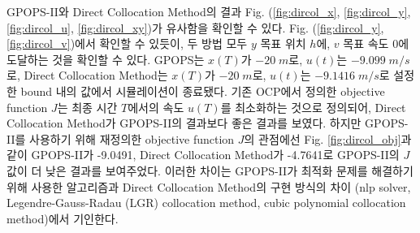 GPOPS-II와 Direct Collocation Method의 결과 Fig. (\ref{fig:dircol_x}, \ref{fig:dircol_y}, \ref{fig:dircol_u}, \ref{fig:dircol_xy})가 유사함을 확인할 수 있다.
Fig. (\ref{fig:dircol_y}, \ref{fig:dircol_v})에서 확인할 수 있듯이, 두 방법 모두 $y$ 목표 위치 $h$에, $v$ 목표 속도 $0$에 도달하는 것을 확인할 수 있다.
GPOPS는 $x(T)$가 $-20\;m$로, $u(t)$는 $-9.099\;m/s$로, Direct Collocation Method는 $x(T)$가 $-20\;m$로, $u(t)$는 $-9.1416\;m/s$로 설정한 bound 내의 값에서 시뮬레이션이 종료됐다.
기존 OCP에서 정의한 objective function $J$는 최종 시간 $T$에서의 속도 $u(T)$를 최소화하는 것으로 정의되어, Direct Collocation Method가 GPOPS-II의 결과보다 좋은 결과를 보였다.
하지만 GPOPS-II를 사용하기 위해 재정의한 objective function $J$의 관점에선 Fig. \ref{fig:dircol_obj}과 같이 GPOPS-II가 -9.0491, Direct Collocation Method가 -4.7641로 GPOPS-II의 $J$ 값이 더 낮은 결과를 보여주었다.
이러한 차이는 GPOPS-II가 최적화 문제를 해결하기 위해 사용한 알고리즘과 Direct Collocation Method의 구현 방식의 차이 (nlp solver, Legendre-Gauss-Radau (LGR) collocation method, cubic polynomial collocation method)에서 기인한다.



